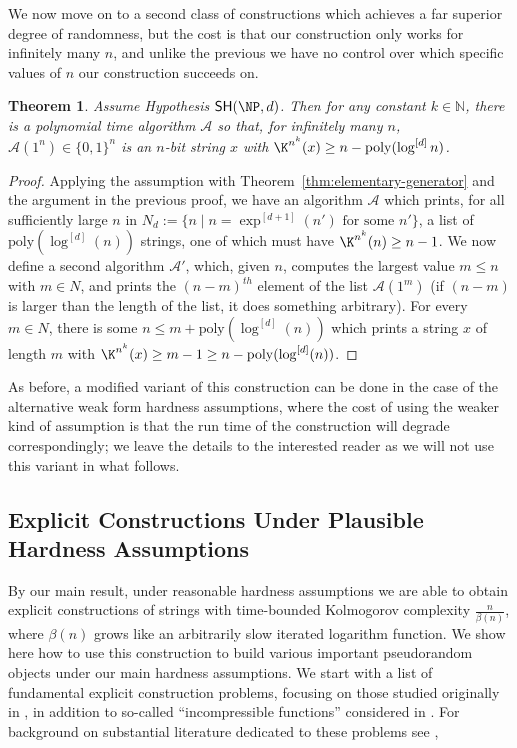 \documentclass[11pt]{article}
\newtheorem{theorem}{Theorem}
\newcommand{\B}{\{0,1\}}
\newcommand{\SH}{\mathsf{SH}}
\renewcommand{\poly}{\mathrm{poly}}
\begin{document}
We now move on to a second class of constructions which achieves a far superior degree of randomness, but the cost is that our construction only works for infinitely many $n$, and unlike the previous we have no control over which specific values of $n$ our construction succeeds on.

\begin{theorem}\label{thm:elementary-strings-io}
    Assume Hypothesis $\SH(\NP,d)$. Then for any constant $k \in \mathbb{N}$, there is a polynomial time algorithm $\mathcal{A}$ so that, for infinitely many $n$, $\mathcal{A}(1^n) \in \B^{n}$ is an $n$-bit string $x$ with $\K^{n^k}(x) \geq  n - \poly(\log^{[d]}n)$. 
\end{theorem}
\begin{proof}
Applying the assumption with Theorem~\ref{thm:elementary-generator} and the argument in the previous proof, we have an algorithm $\mathcal{A}$ which prints, for all sufficiently large $n$ in $N_d:=\{ n \mid n = \exp^{[d+1]}(n') \text{ for some } n'\}$, a list of $\poly(\log^{[d]}(n))$ strings, one of which must have $\K^{n^k}(n) \geq n-1$. We now define a second algorithm $\mathcal{A}'$, which, given $n$, computes the largest value $m \leq  n$ with $m \in N$, and prints the $(n - m)^{th}$ element of the list $\mathcal{A}(1^m)$ (if $(n-m)$ is larger than the length of the list, it does something arbitrary). For every $m \in N$, there is some $n \leq m + \poly(\log^{[d]}(n))$ which prints a string $x$ of length $m$ with $\K^{n^k}(x) \geq m-1 \geq n - \poly(\log^{[d]}(n))$. 
\end{proof}

As before, a modified variant of this construction can be done in the case of the alternative weak form hardness assumptions, where the cost of using the weaker kind of assumption is that the run time of the construction will degrade correspondingly; we leave the details to the interested reader as we will not use this variant in what follows.


\subsection{Explicit Constructions Under Plausible Hardness Assumptions}\label{subsec:ecs}
By our main result, under reasonable hardness assumptions we are able to obtain explicit constructions of strings with time-bounded Kolmogorov complexity $\frac{n}{\beta(n)}$, where $\beta(n)$ grows like an arbitrarily slow iterated logarithm function. We show here how to use this construction to build various important pseudorandom objects under our main hardness assumptions. We start with a list of fundamental explicit construction problems, focusing on those studied originally in \cite{Korten21}, in addition to so-called ``incompressible functions'' considered in \cite{incompressible}. For background on substantial literature dedicated to these problems see \cite{Korten21,incompressible},
\end{document}

